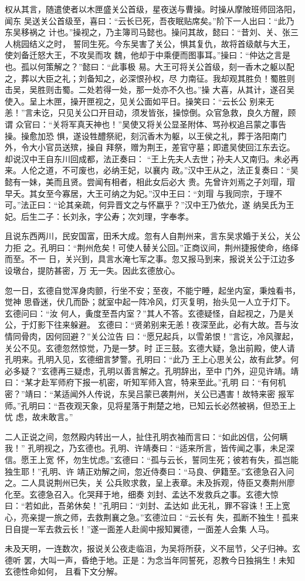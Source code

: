 权从其言，随遣使者以木匣盛关公首级，星夜送与曹操。时操从摩陂班师回洛阳，闻东
吴送关公首级至，喜曰：“云长已死，吾夜眠贴席矣。”阶下一人出曰：“此乃东吴移祸之
计也。”操视之，乃主簿司马懿也。操问其故，懿曰：“昔刘、关、张三人桃园结义之时，
誓同生死。今东吴害了关公，惧其复仇，故将首级献与大王，使刘备迁怒大王，不攻吴而攻
魏，他却于中乘便而图事耳。”操曰：“仲达之言是也。孤以何策解之？”懿曰：“此事极
易。大王可将关公首级，刻一香木之躯以配之，葬以大臣之礼；刘备知之，必深恨孙权，尽
力南征。我却观其胜负！蜀胜则击吴，吴胜则击蜀。二处若得一处，那一处亦不久也。”操
大喜，从其计，遂召吴使入。呈上木匣，操开匣视之，见关公面如平日。操笑曰：“云长公
别来无恙！”言未讫，只见关公口开目动，须发皆张，操惊倒。众官急救，良久方醒，顾谓
众官曰：“关将军真天神也！”吴使又将关公显圣附体、骂孙权追吕蒙之事告操。操愈加恐
惧，遂设牲醴祭祀，刻沉香木为躯，以王侯之礼，葬于洛阳南门外，令大小官员送殡，操自
拜祭，赠为荆王，差官守墓；即遣吴使回江东去讫。却说汉中王自东川回成都，法正奏曰：
“王上先夫人去世；孙夫人又南归。未必再来。人伦之道，不可废也，必纳王妃，以襄内
政。”汉中王从之，法正复奏曰：“吴懿有一妹，美而且贤。尝闻有相者，相此女后必大
贵。先曾许刘焉之子刘瑁，瑁早夭。其女至今寡居，大王可纳之为妃。”汉中王曰：“刘瑁
与我同宗，于理不可。”法正曰：“论其亲疏，何异晋文之与怀嬴乎？”汉中王乃依允，遂
纳吴氏为王妃。后生二子：长刘永，字公寿；次刘理，字奉孝。

且说东西两川，民安国富，田禾大成。忽有人自荆州来，言东吴求婚于关公，关公力拒
之。孔明曰：“荆州危矣！可使人替关公回。”正商议间，荆州捷报使命，络绎而至。不一
日，关兴到，具言水淹七军之事。忽又报马到来，报说关公于江边多设墩台，提防甚密，万
无一失。因此玄德放心。

忽一日，玄德自觉浑身肉颤，行坐不安；至夜，不能宁睡，起坐内室，秉烛看书，觉神
思昏迷，伏几而卧；就室中起一阵冷风，灯灭复明，抬头见一人立于灯下。玄德问曰：“汝
何人，夤度至吾内室？”其人不答。玄德疑怪，自起视之，乃是关公，于灯影下往来躲避。
玄德曰：“贤弟别来无恙！夜深至此，必有大故。吾与汝情同骨肉，因何回避？”关公泣告
曰：“愿兄起兵，以雪弟恨！”言讫，冷风骤起，关公不见。玄德忽然惊觉，乃是一梦。时
正三鼓。玄德大疑，急出前殿，使人请孔明来。孔明入见，玄德细言梦警。孔明曰：“此乃
王上心思关公，故有此梦。何必多疑？”玄德再三疑虑，孔明以善言解之。孔明辞出，至中
门外，迎见许靖。靖曰：“某才赴军师府下报一机密，听知军师入宫，特来至此。”孔明
曰：“有何机密？”靖曰：“某适闻外人传说，东吴吕蒙已袭荆州，关公已遇害！故特来密
报军师。”孔明曰：“吾夜观天象，见将星落于荆楚之地，已知云长必然被祸，但恐王上忧
虑，故未敢言。”

二人正说之间，忽然殿内转出一人，扯住孔明衣袖而言曰：“如此凶信，公何瞒我！”
孔明视之，乃玄德也。孔明、许靖奏曰：“适来所言，皆传闻之事，未足深信。愿王上宽
怀，勿生忧虑。”玄德曰：“孤与云长，誓同生死；彼若有失，孤岂能独生耶！”孔明、许
靖正劝解之间，忽近侍奏曰：“马良、伊籍至。”玄德急召入问之。二人具说荆州已失，关
公兵败求救，呈上表章。未及拆观，侍臣又奏荆州廖化至。玄德急召入。化哭拜于地，细奏
刘封、孟达不发救兵之事。玄德大惊曰：“若如此，吾弟休矣！”孔明曰：“刘封、孟达如
此无礼，罪不容诛！王上宽心，亮亲提一旅之师，去救荆襄之急。”玄德泣曰：“云长有
失，孤断不独生！孤来日自提一军去救云长！”遂一面差人赴阆中报知翼德，一面差人会集
人马。

未及天明，一连数次，报说关公夜走临沮，为吴将所获，义不屈节，父子归神。玄德听
罢，大叫一声，昏绝于地。正是：为念当年同誓死，忍教今日独捐生！未知玄德性命如何，
且看下文分解。